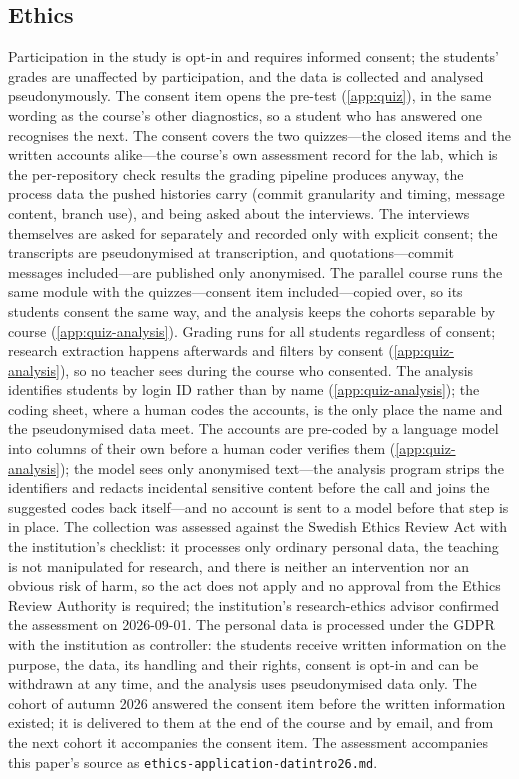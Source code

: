\subsection{Ethics}
\label{sec:ethics}

Participation in the study is opt-in and requires informed consent; the
students' grades are unaffected by participation, and the data is
collected and analysed pseudonymously.
The consent item opens the pre-test (\cref{app:quiz}), in the same
wording as the course's other diagnostics, so a student who has answered
one recognises the next.
The consent covers the two quizzes---the closed items and the written
accounts alike---the course's own assessment record for the lab, which
is the per-repository check results the grading pipeline produces
anyway, the process data the pushed histories carry (commit granularity
and timing, message content, branch use), and being asked about the
interviews.
The interviews themselves are asked for separately and recorded only
with explicit consent; the transcripts are pseudonymised at
transcription, and quotations---commit messages included---are published
only anonymised.
The parallel course runs the same module with the quizzes---consent item
included---copied over, so its students consent the same way, and the
analysis keeps the cohorts separable by course (\cref{app:quiz-analysis}).
Grading runs for all students regardless of consent; research extraction
happens afterwards and filters by consent (\cref{app:quiz-analysis}), so
no teacher sees during the course who consented.
The analysis identifies students by login ID rather than by name
(\cref{app:quiz-analysis}); the coding sheet, where a human codes the
accounts, is the only place the name and the pseudonymised data meet.
The accounts are pre-coded by a language model into columns of their
own before a human coder verifies them (\cref{app:quiz-analysis}); the
model sees only anonymised text---the analysis program strips the
identifiers and redacts incidental sensitive content before the call and
joins the suggested codes back itself---and no account is sent to a
model before that step is in place.
The collection was assessed against the Swedish Ethics Review Act
\autocite{Etikprovningslagen} with the institution's checklist: it
processes only ordinary personal data, the teaching is not manipulated
for research, and there is neither an intervention nor an obvious risk
of harm, so the act does not apply and no approval from the Ethics
Review Authority is required; the institution's research-ethics advisor
confirmed the assessment on 2026-09-01.
The personal data is processed under the GDPR with the institution as
controller: the students receive written information on the purpose,
the data, its handling and their rights, consent is opt-in and can be
withdrawn at any time, and the analysis uses pseudonymised data only.
The cohort of autumn 2026 answered the consent item before the written
information existed; it is delivered to them at the end of the course
and by email, and from the next cohort it accompanies the consent item.
The assessment accompanies this paper's source as
\texttt{ethics-application-datintro26.md}.

